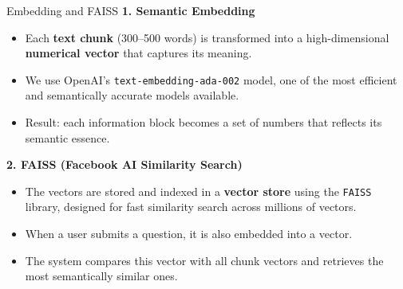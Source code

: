 \documentclass[aspectratio=169,xcolor=dvipsnames]{beamer}
\begin{document}
\begin{frame}{Embedding and FAISS}
  \textbf{1. Semantic Embedding}
  \begin{itemize}
      \item Each \textbf{text chunk} (300–500 words) is transformed into a high-dimensional \textbf{numerical vector} that captures its meaning.
      \item We use OpenAI’s \texttt{text-embedding-ada-002} model, one of the most efficient and semantically accurate models available.
      \item Result: each information block becomes a set of numbers that reflects its semantic essence.
  \end{itemize}
  
  \vspace{0.3cm}
  \textbf{2. FAISS (Facebook AI Similarity Search)}
  \begin{itemize}
      \item The vectors are stored and indexed in a \textbf{vector store} using the \texttt{FAISS} library, designed for fast similarity search across millions of vectors.
      \item When a user submits a question, it is also embedded into a vector.
      \item The system compares this vector with all chunk vectors and retrieves the most semantically similar ones.
  \end{itemize}
\end{frame}
\end{document}
